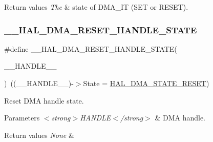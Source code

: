\begin{DoxyRetVals}{Return values}
{\em The} & state of D\+M\+A\+\_\+\+IT (S\+ET or R\+E\+S\+ET). \\
\hline
\end{DoxyRetVals}
\mbox{\label{group___d_m_a___exported___macros_gaadcee34f0999c8eafd37de2f69daa0ac}} 
\subsubsection{\texorpdfstring{\+\_\+\+\_\+\+H\+A\+L\+\_\+\+D\+M\+A\+\_\+\+R\+E\+S\+E\+T\+\_\+\+H\+A\+N\+D\+L\+E\+\_\+\+S\+T\+A\+TE}{\_\_HAL\_DMA\_RESET\_HANDLE\_STATE}}
{\footnotesize\ttfamily \#define \+\_\+\+\_\+\+H\+A\+L\+\_\+\+D\+M\+A\+\_\+\+R\+E\+S\+E\+T\+\_\+\+H\+A\+N\+D\+L\+E\+\_\+\+S\+T\+A\+TE(\begin{DoxyParamCaption}\item[{}]{\+\_\+\+\_\+\+H\+A\+N\+D\+L\+E\+\_\+\+\_\+ }\end{DoxyParamCaption})~((\+\_\+\+\_\+\+H\+A\+N\+D\+L\+E\+\_\+\+\_\+)-\/$>$State = \hyperlink{group___d_m_a___exported___types_gga9c012af359987a240826f29073bbe463a9e7be73da32b8c837cde0318e0d5eed2}{H\+A\+L\+\_\+\+D\+M\+A\+\_\+\+S\+T\+A\+T\+E\+\_\+\+R\+E\+S\+ET})}



Reset D\+MA handle state. 


\begin{DoxyParams}{Parameters}
{\em $<$strong$>$\+H\+A\+N\+D\+L\+E$<$/strong$>$} & D\+MA handle. \\
\hline
\end{DoxyParams}

\begin{DoxyRetVals}{Return values}
{\em None} & \\
\hline
\end{DoxyRetVals}
